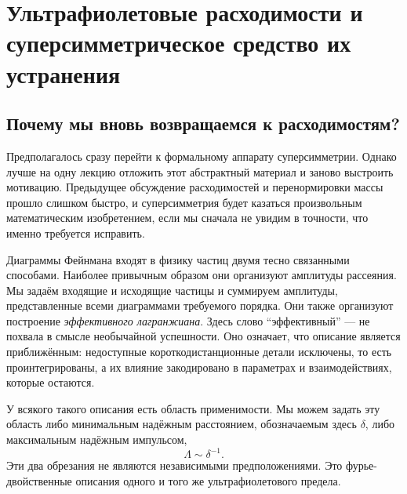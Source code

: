 \chapter{Ультрафиолетовые расходимости и суперсимметрическое средство их устранения}


\section{Почему мы вновь возвращаемся к расходимостям?}

Предполагалось сразу перейти к формальному аппарату суперсимметрии. Однако лучше на одну лекцию отложить этот абстрактный материал и заново выстроить мотивацию. Предыдущее обсуждение расходимостей и перенормировки массы прошло слишком быстро, и суперсимметрия будет казаться произвольным математическим изобретением, если мы сначала не увидим в точности, что именно требуется исправить.

Диаграммы Фейнмана входят в физику частиц двумя тесно связанными способами. Наиболее привычным образом они организуют амплитуды рассеяния. Мы задаём входящие и исходящие частицы и суммируем амплитуды, представленные всеми диаграммами требуемого порядка. Они также организуют построение \emph{эффективного лагранжиана}. Здесь слово ``эффективный'' — не похвала в смысле необычайной успешности. Оно означает, что описание является приближённым: недоступные короткодистанционные детали исключены, то есть проинтегрированы, а их влияние закодировано в параметрах и взаимодействиях, которые остаются.

У всякого такого описания есть область применимости. Мы можем задать эту область либо минимальным надёжным расстоянием, обозначаемым здесь \(\delta\), либо максимальным надёжным импульсом,
\begin{equation}
\Lambda\sim \delta^{-1}.
\end{equation}
Эти два обрезания не являются независимыми предположениями. Это фурье-двойственные описания одного и того же ультрафиолетового предела.


